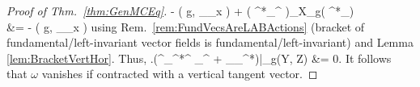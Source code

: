 \documentclass[a4paper,oneside,11pt,bibliography=totoc]{scrartcl}
\def\bas#1\eas{\begin{align*}#1\end{align*}}
\theoremstyle{plain}
\theoremstyle{remark}
\theoremstyle{definition}
\begin{document}
\begin{proof}[Proof of Thm.\ \ref{thm:GenMCEq}]
	- \mleft( g, \mleft[ \nu_x, \mu_x \mright]_{_x} \mright)
	+ \mleft( \pi^*_{}\nabla^{} \mright)_{X_g}\mleft( \pi^*_{}\nu \mright)
\\
&=
- \mleft( g, \mleft[ \nu_x, \mu_x \mright]_{_x} \mright)
\eas
using Rem.\ \ref{rem:FundVecsAreLABActions} (bracket of fundamental/left-invariant vector fields is fundamental/left-invariant) and Lemma \ref{lem:BracketVertHor}. Thus,
\bas
\mleft.\mleft(^{\pi_{}^*\nabla^{}} \mu_{}^{}
	+  _{\pi_{}^*}\mright)\mright|_g(Y, Z)
&=
0.
\eas
It follows that $\omega$ vanishes if contracted with a vertical tangent vector.


\end{proof}
\end{document}
